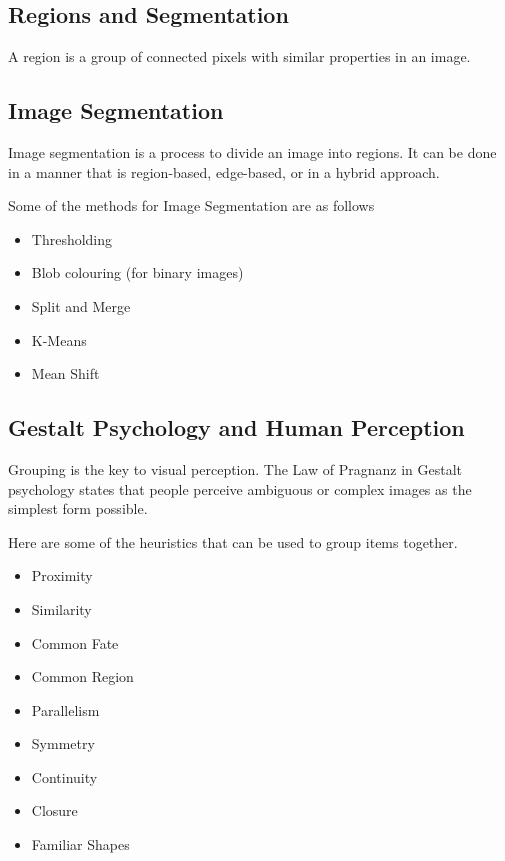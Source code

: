\documentclass{article}
\begin{document}
\begin{multicols}{2}
\section{Regions and Segmentation}

A region is a group of connected pixels with similar properties in an image.

\subsection{Image Segmentation}

Image segmentation is a process to divide an image into regions. It can be done in a manner that is region-based, edge-based, or in a hybrid approach.

Some of the methods for Image Segmentation are as follows
\begin{itemize}
  \item {Thresholding}
  \item {Blob colouring (for binary images)}
  \item {Split and Merge}
  \item {K-Means}
  \item {Mean Shift}
\end{itemize}

\subsection{Gestalt Psychology and Human Perception}

Grouping is the key to visual perception. The Law of Pragnanz in Gestalt psychology states that people perceive ambiguous or complex images as the simplest form possible.

Here are some of the heuristics that can be used to group items together.
\begin{multicols}{3}
\begin{itemize}
  \item {Proximity}
  \item {Similarity}
  \item {Common Fate}
  \item {Common Region}
  \item {Parallelism}
  \item {Symmetry}
  \item {Continuity}
  \item {Closure}
  \item {Familiar Shapes}
\end{itemize}
\end{multicols}


\end{multicols}
\end{document}
